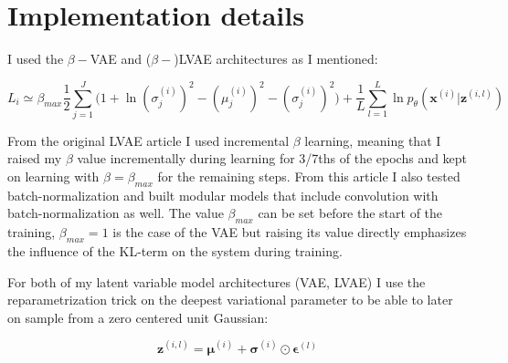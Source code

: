 \documentclass[12pt, english]{article}
\begin{document}
\newpage

\section{Implementation details}

\vspace{7mm}

\par I used the $\beta-$VAE and ($\beta-$)LVAE architectures as I mentioned:

\vspace{4mm}

\begin{equation}
    L_{i} \simeq \beta_{max}\frac{1}{2}\sum_{j = 1}^{J}\Big( 1 + \ln(\sigma^{(i)}_{j})^{2} - (\mu^{(i)}_{j})^{2} - (\sigma^{(i)}_{j})^{2} \Big) + \frac{1}{L}\sum_{l=1}^{L}\ln p_{\theta}(\bm{x}^{(i)} | \bm{z}^{(i, l)})
\end{equation}

\vspace{4mm}

\par From the original LVAE article \cite{sonderby2016ladder} I used incremental $\beta$ learning, meaning that I raised my $\beta$ value incrementally during learning for 3/7ths of the epochs and kept on learning with $\beta = \beta_{max}$ for the remaining steps. From this article I also tested batch-normalization and built modular models that include convolution with batch-normalization as well. The value $\beta_{max}$ can be set before the start of the training, $\beta_{max} = 1$ is the case of the VAE but raising its value directly emphasizes the influence of the KL-term on the system during training.

\vspace{4mm}

\par For both of my latent variable model architectures (VAE, LVAE) I use the reparametrization trick on the deepest variational parameter to be able to later on sample from a zero centered unit Gaussian:

\vspace{4mm}

\begin{equation}
    \boldsymbol{\bm{z}}^{(i, l)} = \boldsymbol{\mu}^{(i)} + \boldsymbol{\sigma}^{(i)} \odot \boldsymbol{\bm{\epsilon}}^{(l)}
\end{equation}

\vspace{4mm}
\end{document}
